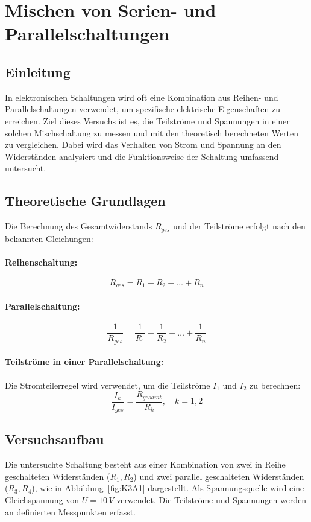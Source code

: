 \section{Mischen von Serien- und Parallelschaltungen}
\subsection{Einleitung}
In elektronischen Schaltungen wird oft eine Kombination aus Reihen- und Parallelschaltungen verwendet, um spezifische elektrische Eigenschaften zu erreichen. Ziel dieses Versuchs ist es, die Teilströme und Spannungen in einer solchen Mischschaltung zu messen und mit den theoretisch berechneten Werten zu vergleichen. Dabei wird das Verhalten von Strom und Spannung an den Widerständen analysiert und die Funktionsweise der Schaltung umfassend untersucht.

\subsection{Theoretische Grundlagen}
Die Berechnung des Gesamtwiderstands \(R_{ges}\) und der Teilströme erfolgt nach den bekannten Gleichungen:

\paragraph{Reihenschaltung:}
\begin{equation}
    R_{ges} = R_1 + R_2 + \ldots + R_n
\end{equation}

\paragraph{Parallelschaltung:}
\begin{equation}
    \frac{1}{R_{ges}} = \frac{1}{R_1} + \frac{1}{R_2} + \ldots + \frac{1}{R_n}
\end{equation}

\paragraph{Teilströme in einer Parallelschaltung:}
Die Stromteilerregel wird verwendet, um die Teilströme \(I_1\) und \(I_2\) zu berechnen:
\begin{equation}
    \frac{I_k}{I_{ges}} = \frac{R_{gesamt}}{R_k}, \quad k = 1, 2
\end{equation}

\subsection{Versuchsaufbau}
Die untersuchte Schaltung besteht aus einer Kombination von zwei in Reihe geschalteten Widerständen (\(R_1, R_2\)) und zwei parallel geschalteten Widerständen (\(R_3, R_4\)), wie in Abbildung~\ref{fig:K3A1} dargestellt. Als Spannungsquelle wird eine Gleichspannung von \(U = 10 \,\unit{V}\) verwendet. Die Teilströme und Spannungen werden an definierten Messpunkten erfasst.

